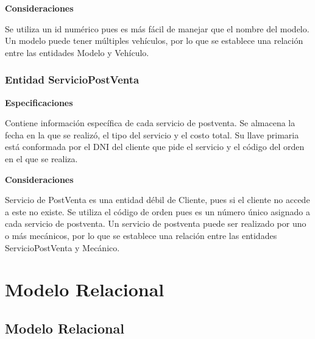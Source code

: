 \documentclass[12pt]{article}
\begin{document}
\textbf{Consideraciones}

Se utiliza un id numérico pues es más fácil de manejar que el nombre del modelo. Un modelo puede tener múltiples vehículos, por lo que se establece una relación entre las entidades Modelo y Vehículo.

\subsubsection{Entidad ServicioPostVenta}
\textbf{Especificaciones}

Contiene información específica de cada servicio de postventa. Se almacena la fecha en la que se realizó, el tipo del servicio y el costo total. Su llave primaria está conformada por el DNI del cliente que pide el servicio y el código del orden en el que se realiza.

\textbf{Consideraciones}

Servicio de PostVenta es una entidad débil de Cliente, pues si el cliente no accede a este no existe. Se utiliza el código de orden pues es un número único asignado a cada servicio de postventa. Un servicio de postventa puede ser realizado por uno o más mecánicos, por lo que se establece una relación entre las entidades ServicioPostVenta y Mecánico.

\section{Modelo Relacional}

\subsection{Modelo Relacional}
\end{document}
